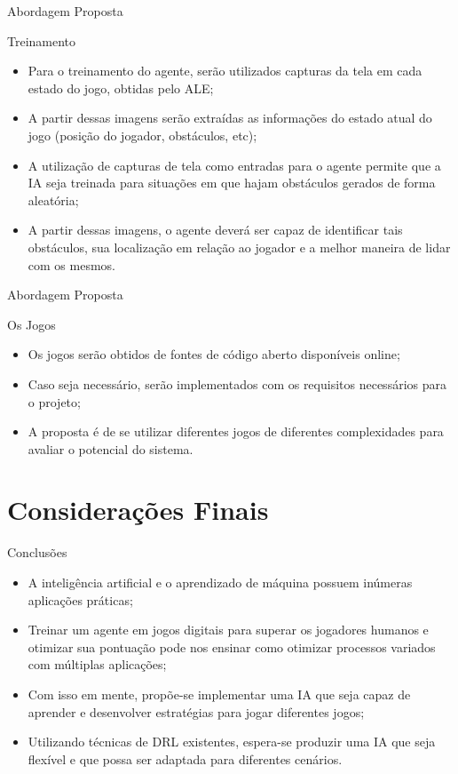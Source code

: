 \documentclass[aspectratio=169]{beamer}
\begin{document}
\begin{frame}{Abordagem Proposta}
	\begin{block}{Treinamento}
		\begin{itemize}
			\item Para o treinamento do agente, serão utilizados capturas da tela em cada estado do jogo, obtidas pelo ALE;
			\item A partir dessas imagens serão extraídas as informações do estado atual do jogo (posição do jogador, obstáculos, etc);
			\item A utilização de capturas de tela como entradas para o agente permite que a IA seja treinada para situações em que hajam obstáculos gerados de forma aleatória;
			\item A partir dessas imagens, o agente deverá ser capaz de identificar tais obstáculos, sua localização em relação ao jogador e a melhor maneira de lidar com os mesmos.
		\end{itemize}
	\end{block}
	
\end{frame}
\begin{frame}{Abordagem Proposta}
	\begin{block}{Os Jogos}
		\begin{itemize}
			\item Os jogos serão obtidos de fontes de código aberto disponíveis online;
			\item Caso seja necessário, serão implementados com os requisitos necessários para o projeto;
			\item A proposta é de se utilizar diferentes jogos de diferentes complexidades para avaliar o potencial do sistema.
		\end{itemize}
	\end{block}
\end{frame}

\section{Considerações Finais}

\begin{frame}{Conclusões}
	\begin{block}{}
		\begin{itemize}
			\item A inteligência artificial e o aprendizado de máquina possuem inúmeras aplicações práticas;
			\item Treinar um agente em jogos digitais para superar os jogadores humanos e otimizar sua pontuação pode nos ensinar como otimizar processos variados com múltiplas aplicações;
			\item Com isso em mente, propõe-se implementar uma IA que seja capaz de aprender e desenvolver estratégias para jogar diferentes jogos;
			\item Utilizando técnicas de DRL existentes, espera-se produzir uma IA que seja flexível e que possa ser adaptada para diferentes cenários.
		\end{itemize}
	\end{block}
\end{frame}
\end{document}
